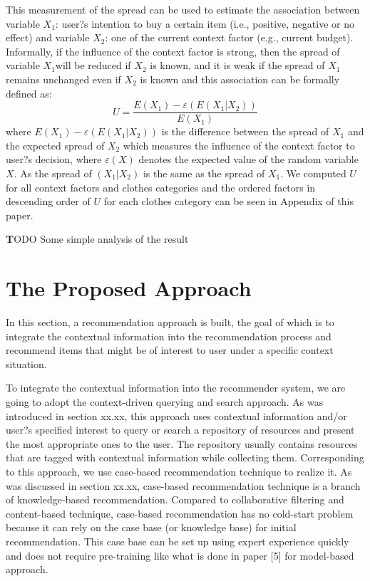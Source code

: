 This measurement of the spread can be used to estimate the association between variable $X_1$:  user?s intention to buy a certain item (i.e., positive, negative or no effect) and variable $X_2$: one of the current context factor (e.g., current budget). Informally, if the influence of the context factor is strong, then the spread of variable $X_1$will be reduced if $X_2$ is known, and it is weak if the spread of $X_1$ remains unchanged even if $X_2$ is known and this association can be formally defined as:
$$U=\frac{E(X_1)-\varepsilon(E(X_1|X_2))}{E(X_1)}$$
where $E(X_1)-\varepsilon(E(X_1|X_2))$ is the difference between the spread of $X_1$ and the expected spread of $X_2$ which measures the influence of the context factor to user?s decision, where $\varepsilon(X)$ denotes the expected value of the random variable $X$. As the spread of $(X_1|X_2)$ is the same as the spread of $X_1$. We computed $U$ for all context factors and clothes categories and the ordered factors in descending order of $U$ for each clothes category can be seen in Appendix of this paper.

\textbf TODO Some simple analysis of the result

\section{The Proposed Approach} \label{sec:pa}

In this section, a recommendation approach is built, the goal of which is to integrate the contextual information into the recommendation process and recommend items that might be of interest to user under a specific context situation.

To integrate the contextual information into the recommender system, we are going to adopt the context-driven querying and search approach. As was introduced in section xx.xx, this approach uses contextual information and/or user?s specified interest to query or search a repository of resources and present the most appropriate ones to the user. The repository usually contains resources that are tagged with contextual information while collecting them. Corresponding to this approach, we use case-based recommendation technique to realize it. As was discussed in section xx.xx, case-based recommendation technique is a branch of knowledge-based recommendation. Compared to collaborative filtering and content-based technique, case-based recommendation has no cold-start problem because it can rely on the case base (or knowledge base) for initial recommendation. This case base can be set up using expert experience quickly and does not require pre-training like what is done in paper [5] for model-based approach. 

